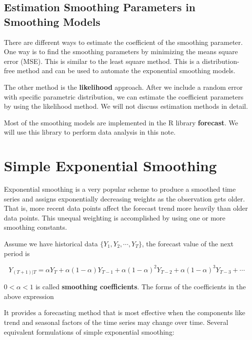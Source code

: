 \documentclass[
]{book}
\begin{document}
\hypertarget{estimation-smoothing-parameters-in-smoothing-models}{%
\subsection{Estimation Smoothing Parameters in Smoothing Models}\label{estimation-smoothing-parameters-in-smoothing-models}}

There are different ways to estimate the coefficient of the smoothing parameter. One way is to find the smoothing parameters by minimizing the means square error (MSE). This is similar to the least square method. This is a distribution-free method and can be used to automate the exponential smoothing models.

The other method is the \textbf{likelihood} approach. After we include a random error with specific parametric distribution, we can estimate the coefficient parameters by using the likelihood method. We will not discuss estimation methods in detail.

Most of the smoothing models are implemented in the R library \textbf{forecast}. We will use this library to perform data analysis in this note.

\hypertarget{simple-exponential-smoothing}{%
\section{Simple Exponential Smoothing}\label{simple-exponential-smoothing}}

Exponential smoothing is a very popular scheme to produce a smoothed time series and assigns exponentially decreasing weights as the observation gets older. That is, more recent data points affect the forecast trend more heavily than older data points. This unequal weighting is accomplished by using one or more smoothing constants.

Assume we have historical data \(\{Y_1, Y_2, \cdots, Y_T \}\), the forecast value of the next period is

\[
Y_{(T+1)|T} = \alpha Y_T + \alpha(1-\alpha)Y_{T-1} + \alpha(1-\alpha)^2Y_{T-2}+\alpha(1-\alpha)^3Y_{T-3} + \cdots
\]

\(0 < \alpha < 1\) is called \textbf{smoothing coefficients}. The forms of the coefficients in the above expression

It provides a forecasting method that is most effective when the components like trend and seasonal factors of the time series may change over time. Several equivalent formulations of simple exponential smoothing:
\end{document}
